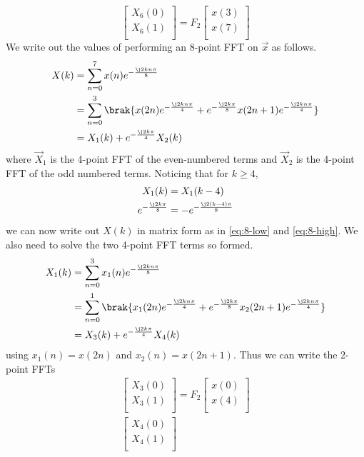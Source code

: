 \documentclass[journal,12pt,twocolumn]{IEEEtran}
\renewcommand\thesection{\arabic{section}}
\begin{document}
\begin{enumerate}[label=\arabic*.,ref=\thesection.\theenumi]
\begin{equation}
\begin{bmatrix}
X_{6}(0) \\ 
X_{6}(1)\\ 
\end{bmatrix}
= F_{2}
\begin{bmatrix}
x(3) \\ 
x(7) \\ 
\end{bmatrix}
\end{equation}
\solution We write out the values of performing an 8-point FFT on $\vec{x}$ as follows.
\begin{align}
	X(k) &= \sum_{n = 0}^{7}x(n)e^{-\frac{\j2kn\pi}{8}} \\
		 &= \sum_{n = 0}^{3}\brak{x(2n)e^{-\frac{\j2kn\pi}{4}} + e^{-\frac{\j2k\pi}{8}}x(2n + 1)e^{-\frac{\j2kn\pi}{4}}} \\
		 &= X_1(k) + e^{-\frac{\j2k\pi}{4}}X_2(k) 
\end{align}
where $\vec{X}_1$ is the 4-point FFT of the even-numbered terms and $\vec{X}_2$ is the 4-point FFT of the odd numbered terms. Noticing that for $k \geq 4$,
\begin{align}
	X_1(k) &= X_1(k - 4) \\
	e^{-\frac{\j2k\pi}{8}} &= -e^{-\frac{\j2(k - 4)\pi}{8}}
\end{align}
we can now write out $X(k)$ in matrix form as in \eqref{eq:8-low} and \eqref{eq:8-high}. We also need to solve the two 4-point FFT terms so formed.
\begin{align}
	X_1(k) &= \sum_{n = 0}^{3}x_1(n)e^{-\frac{\j2kn\pi}{8}} \\
		 &= \sum_{n = 0}^{1}\brak{x_1(2n)e^{-\frac{\j2kn\pi}{4}} + e^{-\frac{\j2k\pi}{8}}x_2(2n + 1)e^{-\frac{\j2kn\pi}{4}}} \\
		 &= X_3(k) + e^{-\frac{\j2k\pi}{4}}X_4(k) 
\end{align}
using $x_1(n) = x(2n)$ and $x_2(n) = x(2n + 1)$. Thus we can write the 2-point FFTs
\begin{align}
\begin{bmatrix}
X_{3}(0) \\ 
X_{3}(1)\\ 
\end{bmatrix}
= F_{2}
\begin{bmatrix}
x(0) \\ 
x(4) \\ 
\end{bmatrix} \\
\begin{bmatrix}
X_{4}(0) \\ 
X_{4}(1)\\ 

\end{bmatrix}
\end{align}
\end{enumerate}
\end{document}

